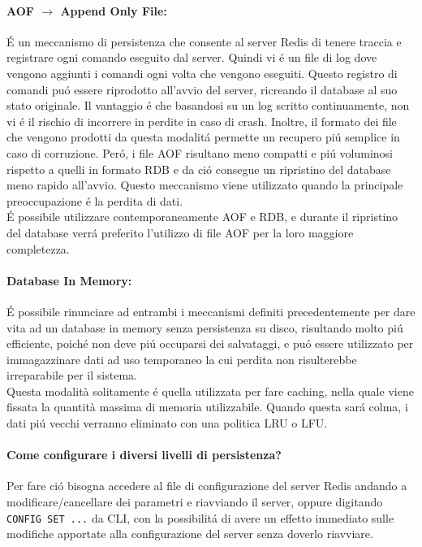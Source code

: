 \begin{itemize}
    \paragraph{AOF $\to$ Append Only File:}
    É un meccanismo di persistenza che consente al server Redis di tenere traccia e registrare ogni comando eseguito dal server.
    Quindi vi é un file di log dove vengono aggiunti i comandi ogni volta che vengono eseguiti.
    Questo registro di comandi puó essere riprodotto all'avvio del server, ricreando il database al suo stato originale.
    Il vantaggio é che basandosi su un log scritto continuamente, non vi é il rischio di incorrere in perdite in caso di crash. Inoltre,
    il formato dei file che vengono prodotti da questa modalitá permette un recupero piú semplice in caso di corruzione.
    Peró, i file AOF risultano meno compatti e piú voluminosi rispetto a quelli in formato RDB e da ció consegue un ripristino del database
    meno rapido all'avvio. Questo meccanismo viene utilizzato quando la principale preoccupazione é la perdita di dati.\\

    É possibile utilizzare contemporaneamente AOF e RDB, e durante il ripristino del database verrá preferito l'utilizzo di file AOF per la loro
    maggiore completezza.


    \paragraph{Database In Memory:}
    É possibile rinunciare ad entrambi i meccanismi definiti precedentemente per dare vita ad un database in memory senza persistenza su disco, risultando molto piú
    efficiente, poiché non deve piú occuparsi dei salvataggi, e puó essere utilizzato per immagazzinare dati ad uso temporaneo la cui
    perdita non risulterebbe irreparabile per il sistema.\\
    Questa modalità solitamente é quella utilizzata per fare caching, nella quale viene fissata la quantità massima di memoria utilizzabile. Quando questa sará
    colma, i dati piú vecchi verranno eliminato con una politica LRU o LFU.
\end{itemize}

\paragraph{Come configurare i diversi livelli di persistenza?\\}
Per fare ció bisogna accedere al file di configurazione del server Redis andando a modificare/cancellare dei parametri e riavviando il server,
oppure digitando \texttt{CONFIG SET ...} da CLI, con la possibilitá di avere un effetto immediato sulle modifiche apportate alla configurazione del server senza doverlo riavviare.\\

